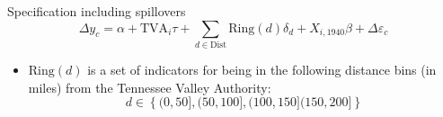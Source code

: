 \documentclass[aspectratio=169,t]{beamer}
\begin{document}
\begin{frame}{Specification including spillovers}
    \begin{equation}
        \Delta y_c = \alpha + \text{TVA}_i \tau + \sum_{d \in \text{Dist}} \text{Ring}(d)\delta_d + X_{i, 1940} \beta + \Delta \varepsilon_c
    \end{equation} 

    \begin{itemize}
        \item $\text{Ring}(d)$ is a set of indicators for being in the following distance bins (in miles) from the Tennessee Valley Authority: 
        \[ d \in \left\{ (0, 50], (50, 100], (100, 150] (150, 200]\right\} \]
    \end{itemize}
\end{frame}

\end{document}
